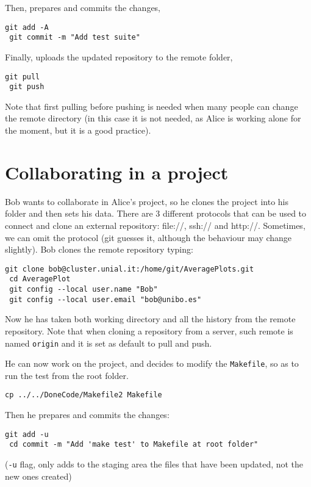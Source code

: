 \documentclass[a4paper,10pt]{article}
\begin{document}
Then, prepares and commits the changes,

\begin{lstlisting}[style=Alice]
 git add -A
 git commit -m "Add test suite"
\end{lstlisting}

Finally, uploads the updated repository to the remote folder,

\begin{lstlisting}[style=Alice]
 git pull
 git push
\end{lstlisting}
Note that first pulling before pushing is needed when many people can change the remote directory (in this case it is not needed, as Alice is working alone for the moment, but it is a good practice).

\clearpage

\section{Collaborating in a project}
Bob wants to collaborate in Alice's project, so he clones the project into his folder and then sets his data. There are 3 different protocols that can be used to connect and clone an external repository: file://, ssh:// and http://. Sometimes, we can omit the protocol (git guesses it, although the behaviour may change slightly). Bob clones the remote repository typing:

\begin{lstlisting}[style=Bob]
 git clone bob@cluster.unial.it:/home/git/AveragePlots.git
 cd AveragePlot
 git config --local user.name "Bob"
 git config --local user.email "bob@unibo.es"
\end{lstlisting}

Now he has taken both working directory and all the history from the remote repository. Note that when cloning a repository from a server, such remote is named \texttt{origin} and it is set as default to pull and push.

He can now work on the project, and decides to modify the \texttt{Makefile}, so as to run the test from the root folder.

\begin{lstlisting}[style=BobFake]
 cp ../../DoneCode/Makefile2 Makefile
\end{lstlisting}

Then he prepares and commits the changes:

\begin{lstlisting}[style=Bob]
 git add -u
 cd commit -m "Add 'make test' to Makefile at root folder"
\end{lstlisting}
(\texttt{-u} flag, only adds to the staging area the files that have been updated, not the new ones created)
\end{document}
